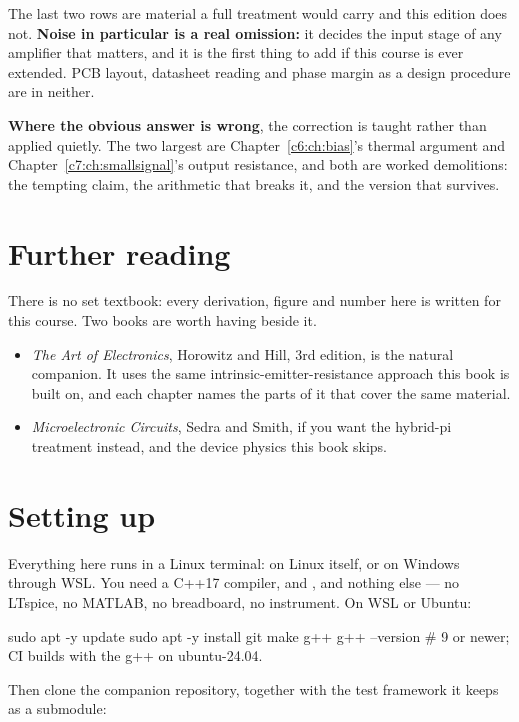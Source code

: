 \noindent The last two rows are material a full treatment would carry and this edition does not.
\textbf{Noise in particular is a real omission:} it decides the input stage of any amplifier that
matters, and it is the first thing to add if this course is ever extended. PCB layout, datasheet
reading and phase margin as a design procedure are in neither.

\textbf{Where the obvious answer is wrong}, the correction is taught rather than applied quietly.
The two largest are Chapter~\ref{c6:ch:bias}'s thermal argument and
Chapter~\ref{c7:ch:smallsignal}'s output resistance, and both are worked demolitions: the tempting
claim, the arithmetic that breaks it, and the version that survives.

\section*{Further reading}
There is no set textbook: every derivation, figure and number here is written for this course. Two
books are worth having beside it.
\begin{itemize}
  \item \textit{The Art of Electronics}, Horowitz and Hill, 3rd edition, is the natural companion.
    It uses the same intrinsic-emitter-resistance approach this book is built on, and each chapter
    names the parts of it that cover the same material.
  \item \textit{Microelectronic Circuits}, Sedra and Smith, if you want the hybrid-pi treatment
    instead, and the device physics this book skips.
\end{itemize}

\section*{Setting up}
Everything here runs in a Linux terminal: on Linux itself, or on Windows through WSL. You need a
C++17 compiler,  and , and nothing else --- no LTspice, no MATLAB, no
breadboard, no instrument. On WSL or Ubuntu:

\begin{shell}
sudo apt -y update
sudo apt -y install git make g++
g++ --version             # 9 or newer; CI builds with the g++ on ubuntu-24.04.
\end{shell}

\noindent Then clone the companion repository, together with the test framework it keeps as a
submodule:

